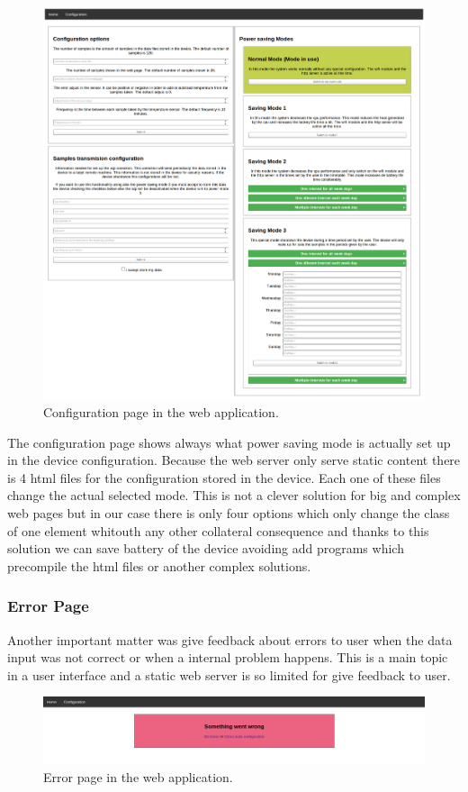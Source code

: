 		\begin{figure}[h!]
		\includegraphics[width=12cm]{fig/configurationpage.png}
		\centering
		\caption{Configuration page in the web application.\label{fig:configurationpage}}
		\end{figure}

		The configuration page shows always what power saving mode is actually set up in the device configuration. Because the web server only serve static content there is 4 html files for the configuration stored in the device. Each one of these files change the actual selected mode. This is not a clever solution for big and complex web pages but in our case there is only four options which only change the class of one element whitouth any other collateral consequence and thanks to this solution we can save battery of the device avoiding add programs which precompile the html files or another complex solutions.

		\subsubsection{Error Page}
		Another important matter was give feedback about errors to user when the data input was not correct or when a internal problem happens. This is a main topic in a user interface and a static web server is so limited for give feedback to user.

		\begin{figure}[h!]
		\includegraphics[width=12cm]{fig/errorpage.png}
		\centering
		\caption{Error page in the web application.\label{fig:errorpage}}
		\end{figure}

